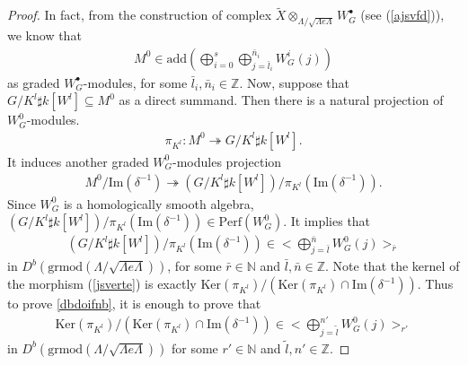 \documentclass[11pt,reqno]{amsart}
\theoremstyle{definition}
\begin{document}
\begin{proof}
In fact, from the construction of complex $\tilde{X} \otimes_{\Lambda / 
\sqrt{\Lambda e \Lambda}} W_G^{\bullet}$ (see (\ref{ajsvfd})), we know that 
\begin{align*}%
M^0 \in \mathrm{add}(\bigoplus_{i = 0}^{s} 
\bigoplus\limits_{j= \bar{l}_i}^{\bar{n}_i} W_G^{i}(j)  )
\end{align*}
as graded $W_G^{\bullet}$-modules, for some $\bar{l}_i, \bar{n}_i \in \mathbb{Z}$. 
Now, suppose that $G/K^l \sharp k[W^l] \subseteq M^0$ as a direct summand. 
Then there is a natural projection of $W_G^0$-modules. 
\begin{align*}%
\pi_{K^l}:  M^0 \twoheadrightarrow  G/K^l \sharp k[W^l].
\end{align*}
It induces another graded $W_G^0$-modules projection 
\begin{align}\label{jsverte}
M^0 / \mathrm{Im}(\delta^{-1}) \twoheadrightarrow  (G/K^l \sharp k[W^l] 
) / \pi_{K^l}(\mathrm{Im}(\delta^{-1})). 
\end{align}
Since $W_G^{0}$ is a homologically smooth algebra, 
$(G/K^l \sharp k[W^l] ) / \pi_{K^l}(\mathrm{Im}(\delta^{-1})) 
\in \mathrm{Perf}(W_G^{0})$. It implies that 
\begin{align*}%
(G/K^l \sharp k[W^l] ) / \pi_{K^l}
(\mathrm{Im}(\delta^{-1})) \in 
\big< \bigoplus\limits_{j= \bar{l}}^{\bar{n}} W_G^{0}(j) \big>_{\bar{r}}
\end{align*}
in $D^{b}(\mathrm{grmod}(\Lambda / \sqrt{\Lambda e \Lambda}) )$,
for some $\bar{r} \in \mathbb{N}$ and $\bar{l}, \bar{n} \in \mathbb{Z}$. 
Note that the kernel of the morphism (\ref{jsverte}) is exactly 
$\mathrm{Ker}(\pi_{K^l}) / 
( \mathrm{Ker}(\pi_{K^l}) 
\cap \mathrm{Im}(\delta^{-1}) )$. 
Thus to prove \eqref{dbdoifnb}, 
it is enough to prove that 
\begin{align}\label{dbdoifnbddd}
\mathrm{Ker}(\pi_{K^l}) / 
(\mathrm{Ker}(\pi_{K^l}) 
\cap \mathrm{Im}(\delta^{-1})) \in 
\big< \bigoplus\limits_{j= \tilde{l}}^{n'} 
W_G^{0}(j) \big>_{r'}
\end{align}
in $D^{b}(\mathrm{grmod}(\Lambda / \sqrt{\Lambda e \Lambda}) )$ 
for some $r' \in \mathbb{N}$ and $\tilde{l}, n' \in \mathbb{Z}$. 


\end{proof}
\end{document}
